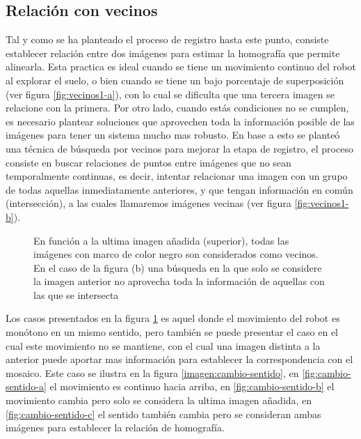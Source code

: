 \subsection{Relación con vecinos}\label{seccion-vecinos}

Tal y como se ha planteado el proceso de registro hasta este punto, consiste establecer relación entre dos imágenes para estimar la homografía que permite alinearla. Esta practica es ideal cuando se tiene un movimiento continuo del robot al explorar el suelo, o bien cuando se tiene un bajo porcentaje de superposición (ver figura \ref{fig:vecinos1-a}), con lo cual se dificulta que una tercera imagen se relacione con la primera. Por otro lado, cuando estás condiciones no se cumplen, es necesario plantear soluciones que aprovechen toda la información posible de las imágenes para tener un sistema mucho mas robusto. En base a esto se planteó una técnica de búsqueda por vecinos para mejorar la etapa de registro, el proceso consiste en buscar relaciones de puntos entre imágenes que no sean temporalmente continuas, es decir, intentar relacionar una imagen con un grupo de todas aquellas inmediatamente anteriores, y que tengan información en común (intersección), a las cuales llamaremos imágenes vecinas (ver figura \ref{fig:vecinos1-b}).


\begin{figure}[h]
	\centering     %
	\hspace{10mm}%
	\caption[Superposición de imagenes vecinas, mismo sentido]{En función a la ultima imagen añadida (superior), todas las imágenes con marco de color negro son considerados como vecinos. En el caso de la figura (b) una búsqueda en la que solo se considere la imagen anterior no aprovecha toda la información de aquellas con las que se intersecta}
	\label{imagen:vecinos1}
\end{figure}

Los casos presentados en la figura \ref{imagen:vecinos1} es aquel donde el movimiento del robot es monótono en un mismo sentido, pero también se puede presentar el caso en el cual este movimiento no se mantiene, con el cual una imagen distinta a la anterior puede aportar mas información para establecer la correspondencia con el mosaico. Este caso se ilustra en la figura \ref{imagen:cambio-sentido}, en \ref{fig:cambio-sentido-a} el movimiento es continuo hacia arriba, en \ref{fig:cambio-sentido-b} el movimiento cambia pero solo se considera la ultima imagen añadida, en \ref{fig:cambio-sentido-c} el sentido también cambia pero se consideran ambas imágenes para establecer la relación de homografía.

